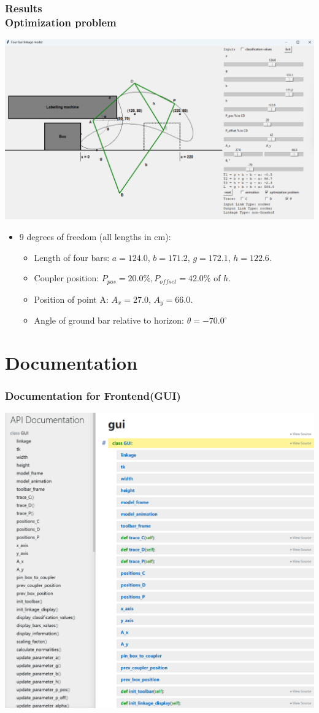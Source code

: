 \documentclass[ucs,10pt]{beamer}
\begin{document}
\begin{frame}
\frametitle{Results \\
	\small \color{rwth-blue} Optimization problem}
	\begin{center}
		\includegraphics[width=0.8\linewidth]{./Figures/optimization_problem_solution.png}
	\end{center}
	\begin{itemize}
		\item 9 degrees of freedom (all lengths in cm):
		\begin{itemize}
			\item Length of four bars: $a = 124.0$, $b = 171.2$, $g = 172.1$, $h = 122.6$.
			\item Coupler position: $P_{pos} = 20.0 \%, P_{offset} = 42.0 \%$ of $h$.
			\item Position of point A: $A_x = 27.0$, $A_y = 66.0$.
			\item Angle of ground bar relative to horizon: $\theta = -70.0^{\circ}$
		\end{itemize}
	\end{itemize}
\end{frame}

\section{Documentation}

\begin{frame}
\frametitle{Documentation for Frontend(GUI)}
\centering
\includegraphics[height=0.65\textwidth]{./Figures/documentation/doc_gui.png}
\end{frame}
\end{document}
